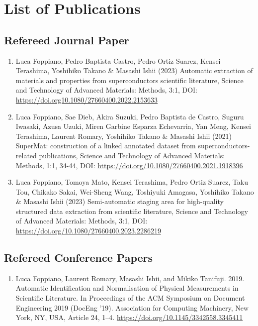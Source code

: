 \chapter*{List of Publications}

\section*{Refereed Journal Paper}
\begin{enumerate}
    \item  Luca Foppiano, Pedro Baptista Castro, Pedro Ortiz Suarez, Kensei Terashima, Yoshihiko Takano \& Masashi Ishii (2023) Automatic extraction of materials and properties from superconductors scientific literature, Science and Technology of Advanced Materials: Methods, 3:1, DOI: \url{https://doi.org10.1080/27660400.2022.2153633}
    \item  Luca Foppiano, Sae Dieb, Akira Suzuki, Pedro Baptista de Castro, Suguru Iwasaki, Azusa Uzuki, Miren Garbine Esparza Echevarria, Yan Meng, Kensei Terashima, Laurent Romary, Yoshihiko Takano \& Masashi Ishii (2021) SuperMat: construction of a linked annotated dataset from superconductors-related publications, Science and Technology of Advanced Materials: Methods, 1:1, 34-44, DOI: \url{https://doi.org/10.1080/27660400.2021.1918396}
    \item  Luca Foppiano, Tomoya Mato, Kensei Terashima, Pedro Ortiz Suarez, Taku Tou, Chikako Sakai, Wei-Sheng Wang, Toshiyuki Amagasa, Yoshihiko Takano \& Masashi Ishii (2023) Semi-automatic staging area for high-quality structured data extraction from scientific literature, Science and Technology of Advanced Materials: Methods, 3:1, DOI: \url{https://doi.org/10.1080/27660400.2023.2286219}
\end{enumerate}
\section*{Refereed Conference Papers}

\begin{enumerate}
    \item Luca Foppiano, Laurent Romary, Masashi Ishii, and Mikiko Tanifuji. 2019. Automatic Identification and Normalisation of Physical Measurements in Scientific Literature. In Proceedings of the ACM Symposium on Document Engineering 2019 (DocEng '19). Association for Computing Machinery, New York, NY, USA, Article 24, 1–4. \url{https://doi.org/10.1145/3342558.3345411}
\end{enumerate}


